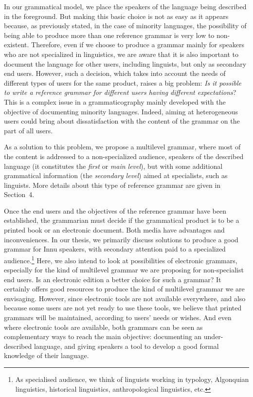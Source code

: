 In our grammatical model, we place the speakers of the language being described in the foreground. But making this basic choice is not as easy as it appears because, as previously stated, in the case of minority languages, the possibility of being able to produce more than one reference grammar is very low to non-existent. Therefore, even if we choose to produce a grammar mainly for speakers who are not specialized in linguistics, we are aware that it is also important to document the language for other users, including linguists, but only as secondary end users. However, such a decision, which takes into account the needs of different types of users for the same product, raises a big problem: \textit{Is it possible to write a reference grammar for different users having different expectations}? This is a complex issue in a grammaticography mainly developed with the objective of documenting minority languages. Indeed, aiming at heterogeneous users could bring about dissatisfaction with the content of the grammar on the part of all users.

As a solution to this problem, we propose a multilevel grammar, where most of the content is addressed to a non-specialized audience, speakers of the described language (it constitutes the \textit{first} or \textit{main level}), but with some additional grammatical information (the \textit{secondary level}) aimed at specialists, such as linguists. More details about this type of reference grammar are given in Section~4.

Once the end users and the objectives of the reference grammar have been established, the grammarian must decide if the grammatical product is to be a printed book or an electronic document. Both media have advantages and inconveniences. In our thesis, we primarily discuss solutions to produce a good grammar for Innu speakers, with secondary attention paid to a specialized audience.\footnote{As
 specialised audience, we think of linguists working in typology, Algonquian linguistics, historical linguistics, anthropological linguistics, etc. } Here, we also intend to look at possibilities of electronic grammars, especially for the kind of multilevel grammar we are proposing for non-specialist end users. Is an electronic edition a better choice for such a grammar? It certainly offers good resources to produce the kind of multilevel grammar we are envisaging. However, since electronic tools are not available everywhere, and also because some users are not yet ready to use these tools, we believe that printed grammars will be maintained, according to users' needs or wishes. And even where electronic tools are available, both grammars can be seen as complementary ways to reach the main objective: documenting an under-described language, and giving speakers a tool to develop a good formal knowledge of their language.

